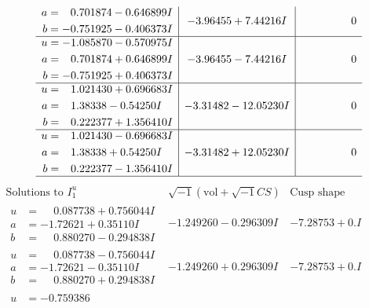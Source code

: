 \documentclass[1p]{elsarticle_modified}
\theoremstyle{definition}
\newcommand{\I}{\sqrt{-1}}
\begin{document}
$$\begin{array}{c|c|c}
\begin{aligned}
a &= \phantom{-}0.701874 - 0.646899 I \\
b &= -0.751925 - 0.406373 I\end{aligned}
 & -3.96455 + 7.44216 I & \phantom{-0.000000 } 0 \\ \hline\begin{aligned}
u &= -1.085870 - 0.570975 I \\
a &= \phantom{-}0.701874 + 0.646899 I \\
b &= -0.751925 + 0.406373 I\end{aligned}
 & -3.96455 - 7.44216 I & \phantom{-0.000000 } 0 \\ \hline\begin{aligned}
u &= \phantom{-}1.021430 + 0.696683 I \\
a &= \phantom{-}1.38338 - 0.54250 I \\
b &= \phantom{-}0.222377 + 1.356410 I\end{aligned}
 & -3.31482 - 12.05230 I & \phantom{-0.000000 } 0 \\ \hline\begin{aligned}
u &= \phantom{-}1.021430 - 0.696683 I \\
a &= \phantom{-}1.38338 + 0.54250 I \\
b &= \phantom{-}0.222377 - 1.356410 I\end{aligned}
 & -3.31482 + 12.05230 I & \phantom{-0.000000 } 0\\
 \hline 
 \end{array}$$\newpage$$\begin{array}{c|c|c}  
\text{Solutions to }I^u_{1}& \I (\text{vol} + \sqrt{-1}CS) & \text{Cusp shape}\\
 \hline 
\begin{aligned}
u &= \phantom{-}0.087738 + 0.756044 I \\
a &= -1.72621 + 0.35110 I \\
b &= \phantom{-}0.880270 - 0.294838 I\end{aligned}
 & -1.249260 - 0.296309 I & -7.28753 + 0. I\phantom{ +0.000000I} \\ \hline\begin{aligned}
u &= \phantom{-}0.087738 - 0.756044 I \\
a &= -1.72621 - 0.35110 I \\
b &= \phantom{-}0.880270 + 0.294838 I\end{aligned}
 & -1.249260 + 0.296309 I & -7.28753 + 0. I\phantom{ +0.000000I} \\ \hline\begin{aligned}
u &= -0.759386\phantom{ +0.000000I} \\

\end{aligned}
\end{array}$$
\end{document}
